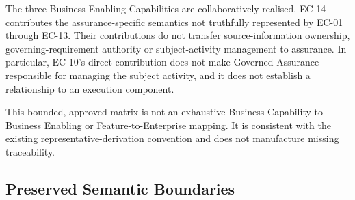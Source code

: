 The three Business Enabling Capabilities are collaboratively realised. EC-14 contributes the assurance-specific semantics not truthfully represented by EC-01 through EC-13. Their contributions do not transfer source-information ownership, governing-requirement authority or subject-activity management to assurance. In particular, EC-10's direct contribution does not make Governed Assurance responsible for managing the subject activity, and it does not establish a relationship to an execution component.

\label{rad:assurance-strategy:77}

This bounded, approved matrix is not an exhaustive Business Capability-to-Business Enabling or Feature-to-Enterprise mapping. It is consistent with the \hyperref[rad:tier-model:256]{existing representative-derivation convention} and does not manufacture missing traceability.

\label{rad:assurance-strategy:79}
\subsection*{Preserved Semantic Boundaries}
\label{rad:assurance-strategy:81}

